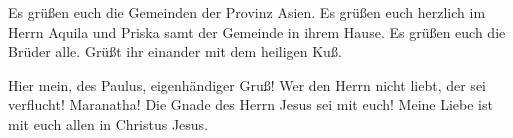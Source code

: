  Es grüßen euch die Gemeinden der Provinz Asien. Es
grüßen euch herzlich im Herrn Aquila und Priska samt der Gemeinde in
ihrem Hause.  Es grüßen euch die Brüder alle. Grüßt ihr
einander mit dem heiligen Kuß.

 Hier mein, des Paulus, eigenhändiger Gruß!
 Wer den Herrn nicht liebt, der sei verflucht! Maranatha!
 Die Gnade des Herrn Jesus sei mit euch! 
Meine Liebe ist mit euch allen in Christus Jesus.
